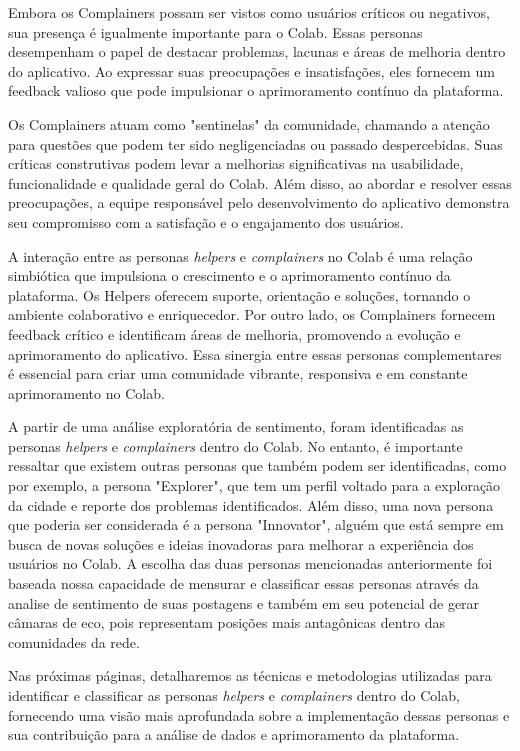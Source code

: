 Embora os Complainers possam ser vistos como usuários críticos ou negativos, sua presença é igualmente importante para o Colab. Essas personas desempenham o papel de destacar problemas, lacunas e áreas de melhoria dentro do aplicativo. Ao expressar suas preocupações e insatisfações, eles fornecem um feedback valioso que pode impulsionar o aprimoramento contínuo da plataforma.

Os Complainers atuam como "sentinelas" da comunidade, chamando a atenção para questões que podem ter sido negligenciadas ou passado despercebidas. Suas críticas construtivas podem levar a melhorias significativas na usabilidade, funcionalidade e qualidade geral do Colab. Além disso, ao abordar e resolver essas preocupações, a equipe responsável pelo desenvolvimento do aplicativo demonstra seu compromisso com a satisfação e o engajamento dos usuários.

A interação entre as personas \textit{helpers} e \textit{complainers} no Colab é uma relação simbiótica que impulsiona o crescimento e o aprimoramento contínuo da plataforma. Os Helpers oferecem suporte, orientação e soluções, tornando o ambiente colaborativo e enriquecedor. Por outro lado, os Complainers fornecem feedback crítico e identificam áreas de melhoria, promovendo a evolução e aprimoramento do aplicativo. Essa sinergia entre essas personas complementares é essencial para criar uma comunidade vibrante, responsiva e em constante aprimoramento no Colab.

A partir de uma análise exploratória de sentimento, foram identificadas as personas \textit{helpers} e \textit{complainers} dentro do Colab. No entanto, é importante ressaltar que existem outras personas que também podem ser identificadas, como por exemplo, a persona "Explorer", que tem um perfil voltado para a exploração da cidade e reporte dos problemas identificados. Além disso, uma nova persona que poderia ser considerada é a persona "Innovator", alguém que está sempre em busca de novas soluções e ideias inovadoras para melhorar a experiência dos usuários no Colab. A escolha das duas personas mencionadas anteriormente foi baseada nossa capacidade de mensurar e classificar essas personas através da analise de sentimento de suas postagens e também em seu potencial de gerar câmaras de eco, pois representam posições mais antagônicas dentro das comunidades da rede.

Nas próximas páginas, detalharemos as técnicas e metodologias utilizadas para identificar e classificar as personas \textit{helpers} e \textit{complainers} dentro do Colab, fornecendo uma visão mais aprofundada sobre a implementação dessas personas e sua contribuição para a análise de dados e aprimoramento da plataforma.

